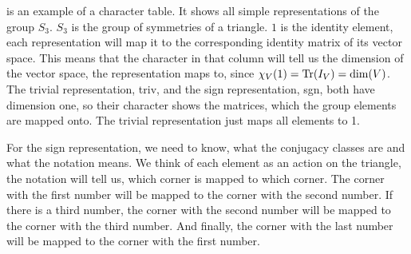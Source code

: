  is an example of a character table.
It shows all simple representations of the group $S_3$.
$S_3$ is the group of symmetries of a triangle.
$1$ is the identity element, each representation will map it to the corresponding identity matrix of its vector space.
This means that the character in that column will tell us the dimension of the vector space, the representation maps to, since $\chi_V(1) = \operatorname{Tr}(I_V) = \dim(V)$.
The trivial representation, triv, and the sign representation, sgn, both have dimension one, so their character shows the matrices, which the group elements are mapped onto.
The trivial representation just maps all elements to 1.

For the sign representation, we need to know, what the conjugacy classes are and what the notation means.
We think of each element as an action on the triangle, the notation will tell us, which corner is mapped to which corner.
The corner with the first number will be mapped to the corner with the second number.
If there is a third number, the corner with the second number will be mapped to the corner with the third number.
And finally, the corner with the last number will be mapped to the corner with the first number.
